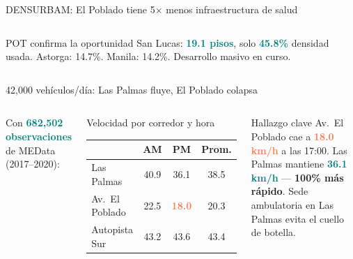 \documentclass[aspectratio=169, 11pt]{beamer}
\newcommand{\highlight}[1]{\textcolor{teal}{\textbf{#1}}}
\newcommand{\danger}[1]{\textcolor{coral}{\textbf{#1}}}
\newcommand{\src}[1]{\par\vspace{2pt}{\tiny\textcolor{slate}{Fuente: #1}}}
\begin{document}
{\begin{frame}{DENSURBAM: El Poblado tiene 5$\times$ menos infraestructura de salud}
\begin{columns}[T]
\vspace{2pt}
\begin{alertblock}{\small POT confirma la oportunidad}
\scriptsize
San Lucas: \highlight{19.1 pisos}, solo \highlight{45.8\%} densidad usada. Astorga: 14.7\%. Manila: 14.2\%. Desarrollo masivo en curso.
\end{alertblock}
\end{columns}
\end{frame}
}

\begin{frame}{42,000 vehículos/día: Las Palmas fluye, El Poblado colapsa}
\begin{columns}[T]
{\small Con \highlight{682,502 observaciones} de MEData (2017--2020):}

\vspace{2pt}
\src{MEData Aforos (b9s9-jw7c), 64,285 obs. $\cdot$ 682K total}

\begin{block}{\small Velocidad por corredor y hora}
\scriptsize
\begin{tabular}{@{}lccc@{}}
\toprule
& AM & PM & Prom. \\
\midrule
\rowcolor{teal!8}
Las Palmas & 40.9 & 36.1 & 38.5 \\
\rowcolor{coral!10}
Av.\ El Poblado & 22.5 & \danger{18.0} & 20.3 \\
Autopista Sur & 43.2 & 43.6 & 43.4 \\
\bottomrule
\end{tabular}
\end{block}

\vspace{2pt}
\begin{alertblock}{\small Hallazgo clave}
\scriptsize
Av.\ El Poblado cae a \danger{18.0 km/h} a las 17:00. Las Palmas mantiene \highlight{36.1 km/h} --- \textbf{100\% más rápido}. Sede ambulatoria en Las Palmas evita el cuello de botella.
\end{alertblock}


\end{columns}
\end{frame}
\end{document}
